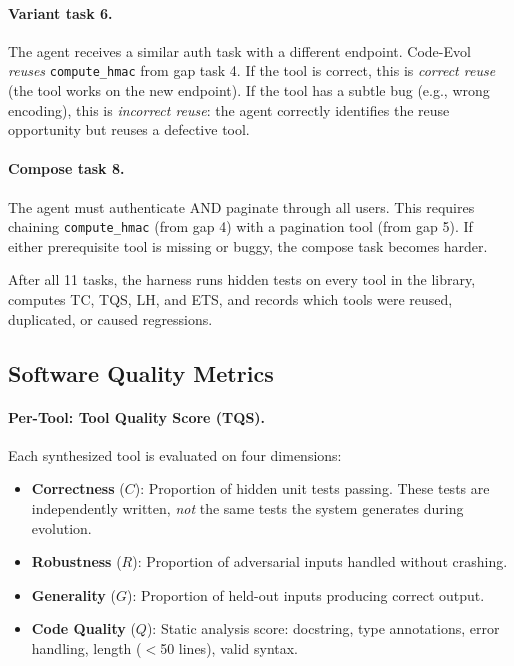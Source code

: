 \documentclass[sigplan,review,anonymous]{acmart}
\begin{document}
\paragraph{Variant task 6.} The agent receives a similar auth task with a different endpoint. Code-Evol \emph{reuses} \texttt{compute\_hmac} from gap task 4. If the tool is correct, this is \emph{correct reuse} (the tool works on the new endpoint). If the tool has a subtle bug (e.g., wrong encoding), this is \emph{incorrect reuse}: the agent correctly identifies the reuse opportunity but reuses a defective tool.

\paragraph{Compose task 8.} The agent must authenticate AND paginate through all users. This requires chaining \texttt{compute\_hmac} (from gap 4) with a pagination tool (from gap 5). If either prerequisite tool is missing or buggy, the compose task becomes harder.

After all 11 tasks, the harness runs hidden tests on every tool in the library, computes TC, TQS, LH, and ETS, and records which tools were reused, duplicated, or caused regressions.

\subsection{Software Quality Metrics}

\paragraph{Per-Tool: Tool Quality Score (TQS).}
Each synthesized tool is evaluated on four dimensions:

\begin{itemize}
\item \textbf{Correctness} ($C$): Proportion of hidden unit tests passing. These tests are independently written, \emph{not} the same tests the system generates during evolution.
\item \textbf{Robustness} ($R$): Proportion of adversarial inputs handled without crashing.
\item \textbf{Generality} ($G$): Proportion of held-out inputs producing correct output.
\item \textbf{Code Quality} ($Q$): Static analysis score: docstring, type annotations, error handling, length ($<$50 lines), valid syntax.
\end{itemize}
\end{document}
